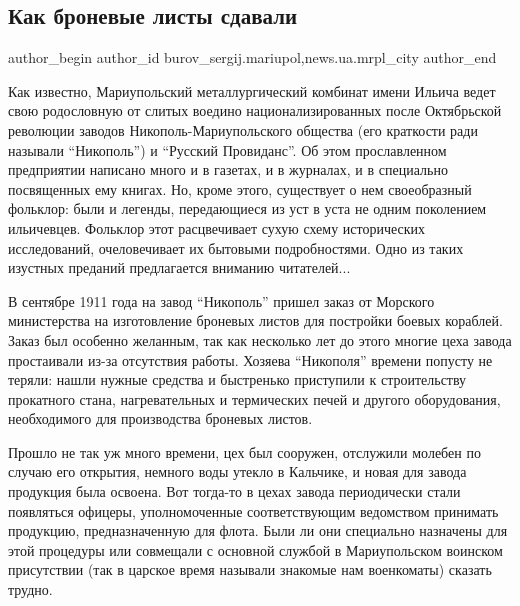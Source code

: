  
 
 
 
 
 
\subsection{Как броневые листы сдавали}
\label{sec:03_12_2016.stz.news.ua.mrpl_city.1.kak_bronevye_listy_sdavali}
 
\ifcmt
 author_begin
   author_id burov_sergij.mariupol,news.ua.mrpl_city
 author_end
\fi


Как известно, Мариупольский металлургический комбинат имени Ильича ведет свою
родословную от слитых воедино национализированных после Октябрьской революции
заводов Никополь-Мариупольского общества (его краткости ради называли
\enquote{Никополь}) и \enquote{Русский Провиданс}. Об этом прославленном предприятии написано
много и в газетах, и в журналах, и в специально посвященных ему книгах. Но,
кроме этого, существует о нем своеобразный фольклор: были и легенды,
передающиеся из уст в уста не одним поколением ильичевцев. Фольклор этот
расцвечивает сухую схему исторических исследований, очеловечивает их бытовыми
подробностями. Одно из таких изустных преданий предлагается вниманию читателей...

В сентябре 1911 года на завод \enquote{Никополь} пришел заказ от Морского министерства
на изготовление броневых листов для постройки боевых кораблей. Заказ был
особенно желанным, так как несколько лет до этого многие цеха завода
простаивали из-за отсутствия работы. Хозяева \enquote{Никополя} времени попусту не
теряли: нашли нужные средства и быстренько приступили к строительству
прокатного стана, нагревательных и термических печей и другого оборудования,
необходимого для производства броневых листов.

Прошло не так уж много времени, цех был сооружен, отслужили молебен по случаю
его открытия, немного воды утекло в Кальчике, и новая для завода продукция была
освоена. Вот тогда-то в цехах завода периодически стали появляться офицеры,
уполномоченные соответствующим ведомством принимать продукцию, предназначенную
для флота. Были ли они специально назначены для этой процедуры или совмещали с
основной службой в Мариупольском воинском присутствии (так в царское время
называли знакомые нам военкоматы) сказать трудно.

